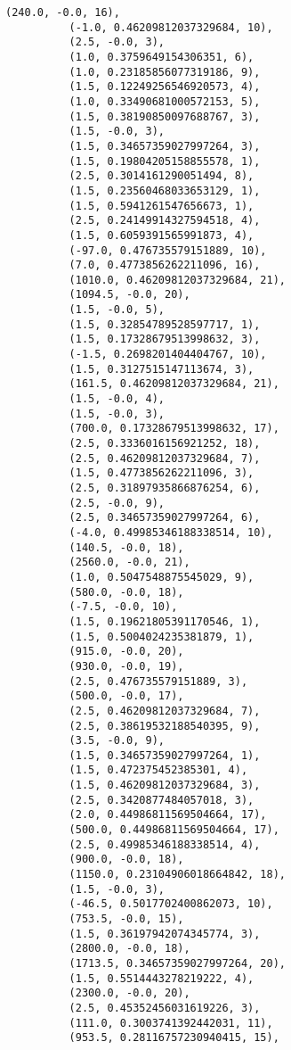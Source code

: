 \documentclass[11pt]{article}
\begin{document}
\begin{Verbatim}[commandchars=\\\{\}]
          (240.0, -0.0, 16),
          (-1.0, 0.46209812037329684, 10),
          (2.5, -0.0, 3),
          (1.0, 0.3759649154306351, 6),
          (1.0, 0.23185856077319186, 9),
          (1.5, 0.12249256546920573, 4),
          (1.0, 0.33490681000572153, 5),
          (1.5, 0.38190850097688767, 3),
          (1.5, -0.0, 3),
          (1.5, 0.34657359027997264, 3),
          (1.5, 0.19804205158855578, 1),
          (2.5, 0.3014161290051494, 8),
          (1.5, 0.23560468033653129, 1),
          (1.5, 0.5941261547656673, 1),
          (2.5, 0.24149914327594518, 4),
          (1.5, 0.6059391565991873, 4),
          (-97.0, 0.476735579151889, 10),
          (7.0, 0.4773856262211096, 16),
          (1010.0, 0.46209812037329684, 21),
          (1094.5, -0.0, 20),
          (1.5, -0.0, 5),
          (1.5, 0.32854789528597717, 1),
          (1.5, 0.17328679513998632, 3),
          (-1.5, 0.2698201404404767, 10),
          (1.5, 0.3127515147113674, 3),
          (161.5, 0.46209812037329684, 21),
          (1.5, -0.0, 4),
          (1.5, -0.0, 3),
          (700.0, 0.17328679513998632, 17),
          (2.5, 0.3336016156921252, 18),
          (2.5, 0.46209812037329684, 7),
          (1.5, 0.4773856262211096, 3),
          (2.5, 0.31897935866876254, 6),
          (2.5, -0.0, 9),
          (2.5, 0.34657359027997264, 6),
          (-4.0, 0.49985346188338514, 10),
          (140.5, -0.0, 18),
          (2560.0, -0.0, 21),
          (1.0, 0.5047548875545029, 9),
          (580.0, -0.0, 18),
          (-7.5, -0.0, 10),
          (1.5, 0.19621805391170546, 1),
          (1.5, 0.5004024235381879, 1),
          (915.0, -0.0, 20),
          (930.0, -0.0, 19),
          (2.5, 0.476735579151889, 3),
          (500.0, -0.0, 17),
          (2.5, 0.46209812037329684, 7),
          (2.5, 0.38619532188540395, 9),
          (3.5, -0.0, 9),
          (1.5, 0.34657359027997264, 1),
          (1.5, 0.472375452385301, 4),
          (1.5, 0.46209812037329684, 3),
          (2.5, 0.3420877484057018, 3),
          (2.0, 0.44986811569504664, 17),
          (500.0, 0.44986811569504664, 17),
          (2.5, 0.49985346188338514, 4),
          (900.0, -0.0, 18),
          (1150.0, 0.23104906018664842, 18),
          (1.5, -0.0, 3),
          (-46.5, 0.5017702400862073, 10),
          (753.5, -0.0, 15),
          (1.5, 0.36197942074345774, 3),
          (2800.0, -0.0, 18),
          (1713.5, 0.34657359027997264, 20),
          (1.5, 0.5514443278219222, 4),
          (2300.0, -0.0, 20),
          (2.5, 0.45352456031619226, 3),
          (111.0, 0.3003741392442031, 11),
          (953.5, 0.28116757230940415, 15),

\end{Verbatim}
\end{document}

